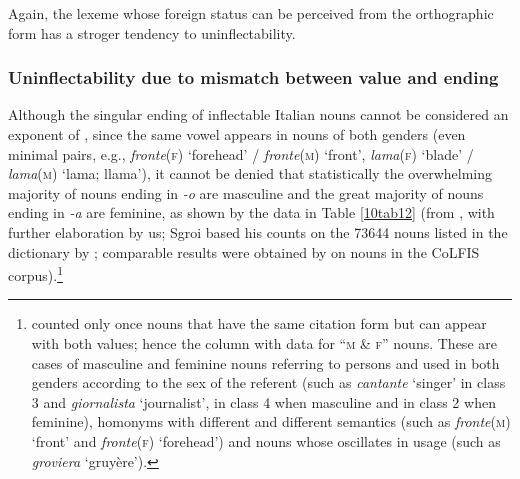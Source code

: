 \documentclass[output=paper,colorlinks,citecolor=brown]{langscibook}
\begin{document}
Again, the lexeme whose foreign status can be perceived from the orthographic form has a stroger tendency to uninflectability.

\subsubsection{Uninflectability due to mismatch between  value and ending}


Although the singular ending of inflectable Italian nouns cannot be considered an exponent of , since the same vowel appears in nouns of both genders (even minimal pairs, e.g., \emph{fronte}(\textsc{f}) `forehead' / \emph{fronte}(\textsc{m)} `front', \emph{lama}(\textsc{f}) `blade' / \emph{lama}(\textsc{m)} `lama; llama'), it cannot be denied that statistically the overwhelming majority of nouns ending in \emph{-o} are masculine and the great majority of nouns ending in \emph{-a} are feminine, as shown by the data in Table \ref{10tab12} (from \citealt[109]{sgroi2008}, with further elaboration by us; Sgroi based his counts on the 73644 nouns listed in the dictionary by \citealt{demauro2000}; comparable results were obtained by \citealt[126]{demartinobraccolaudanna2023} on nouns in the CoLFIS corpus).\footnote{\citet{sgroi2008} counted only once nouns that have the same citation form but can appear with both  values; hence the column with data for ``\textsc{m \& f}'' nouns. These are cases of masculine and feminine nouns referring to persons and used in both genders according to the sex of the referent (such as \emph{cantante} `singer' in class 3 and \emph{giornalista} `journalist', in class 4 when masculine and in class 2 when feminine), homonyms with different  and different semantics (such as \emph{fronte}(\textsc{m}) `front' and \emph{fronte}(\textsc{f}) `forehead') and nouns whose  oscillates in usage (such as \emph{groviera} `gruyère').}
\end{document}
